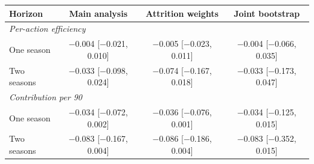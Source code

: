 \begin{tabular}{lccc}
\toprule
Horizon & Main analysis & Attrition weights & Joint bootstrap \\
\midrule
\multicolumn{4}{l}{\textit{Per-action efficiency}} \\
One season & $-$0.004 [$-$0.021, 0.010] & $-$0.005 [$-$0.023, 0.011] & $-$0.004 [$-$0.066, 0.035] \\
Two seasons & $-$0.033 [$-$0.098, 0.024] & $-$0.074 [$-$0.167, 0.018] & $-$0.033 [$-$0.173, 0.047] \\
\multicolumn{4}{l}{\textit{Contribution per 90}} \\
One season & $-$0.034 [$-$0.072, 0.002] & $-$0.036 [$-$0.076, 0.001] & $-$0.034 [$-$0.125, 0.015] \\
Two seasons & $-$0.083 [$-$0.167, 0.004] & $-$0.086 [$-$0.186, 0.004] & $-$0.083 [$-$0.352, 0.015] \\
\bottomrule
\end{tabular}
